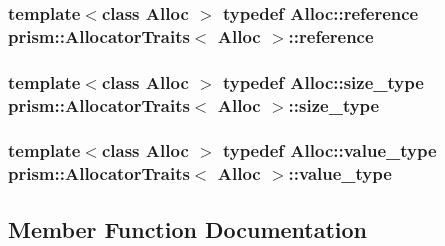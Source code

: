 \subsubsection[{\texorpdfstring{reference}{reference}}]{\setlength{\rightskip}{0pt plus 5cm}template$<$class Alloc $>$ typedef Alloc\+::reference {\bf prism\+::\+Allocator\+Traits}$<$ Alloc $>$\+::{\bf reference}}\hypertarget{structprism_1_1_allocator_traits_aa134d981ab397b1bb691af2da23b1ad6}{}\label{structprism_1_1_allocator_traits_aa134d981ab397b1bb691af2da23b1ad6}
\subsubsection[{\texorpdfstring{size\+\_\+type}{size_type}}]{\setlength{\rightskip}{0pt plus 5cm}template$<$class Alloc $>$ typedef Alloc\+::size\+\_\+type {\bf prism\+::\+Allocator\+Traits}$<$ Alloc $>$\+::{\bf size\+\_\+type}}\hypertarget{structprism_1_1_allocator_traits_a7cf55823ae63bccb9cf50b1e08619363}{}\label{structprism_1_1_allocator_traits_a7cf55823ae63bccb9cf50b1e08619363}
\subsubsection[{\texorpdfstring{value\+\_\+type}{value_type}}]{\setlength{\rightskip}{0pt plus 5cm}template$<$class Alloc $>$ typedef Alloc\+::value\+\_\+type {\bf prism\+::\+Allocator\+Traits}$<$ Alloc $>$\+::{\bf value\+\_\+type}}\hypertarget{structprism_1_1_allocator_traits_a02838686d063e89d7c497fef69592265}{}\label{structprism_1_1_allocator_traits_a02838686d063e89d7c497fef69592265}


\subsection{Member Function Documentation}
